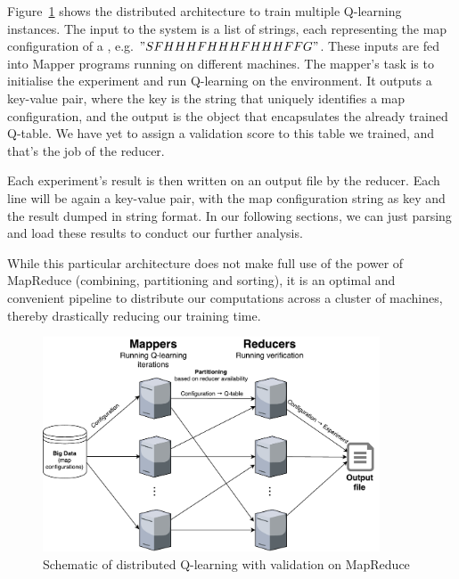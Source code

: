 Figure~\ref{fig:MapReduce} shows the distributed architecture to train multiple Q-learning instances. The input to the system is a list of strings, each representing the map configuration of a , e.g. $"SFHHHFHHHFHHHFFG"$. These inputs are fed into Mapper programs running on different machines. The mapper's task is to initialise the experiment and run Q-learning on the environment. It outputs a key-value pair, where the key is the string that uniquely identifies a map configuration, and the output is the  object that encapsulates the already trained Q-table. We have yet to assign a validation score to this table we trained, and that's the job of the reducer.

Each experiment's result is then written on an output file by the reducer. Each line will be again a key-value pair, with the map configuration string as key and the  result dumped in string format. In our following sections, we can just parsing and load these results to conduct our further analysis.

While this particular architecture does not make full use of the power of MapReduce (combining, partitioning and sorting), it is an optimal and convenient pipeline to distribute our computations across a cluster of machines, thereby drastically reducing our training time.
\begin{figure}
\centering
\includegraphics[width=10cm]{Figures/MapReduce}
\caption{Schematic of distributed Q-learning with validation on MapReduce}
\label{fig:MapReduce}
\end{figure}

